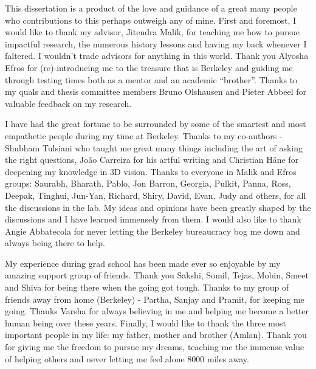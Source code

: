 This dissertation is a product of the love and guidance of a great many people who contributions to this perhaps outweigh any of mine. First and foremost, I would like to thank my advisor, Jitendra Malik, for teaching me how to pursue impactful research, the numerous history lessons and having my back whenever I faltered. I wouldn't trade advisors for anything in this world. Thank you Alyosha Efros for (re)-introducing me to the treasure that is Berkeley and guiding me through testing times both as a mentor and an academic ``brother''. Thanks to my quals and thesis committee members Bruno Olshausen and Pieter Abbeel for valuable feedback on my research.

I have had the great fortune to be surrounded by some of the smartest and most empathetic people during my time at Berkeley. Thanks to my co-authors - Shubham Tulsiani who taught me great many things including the art of asking the right questions, Jo\~ao Carreira for his artful writing and Christian H\"ane for deepening my knowledge in 3D vision. Thanks to everyone in Malik and Efros groups: Saurabh, Bharath, Pablo, Jon Barron, Georgia, Pulkit, Panna, Ross, Deepak, Tinghui, Jun-Yan, Richard, Shiry, David, Evan, Judy and others, for all the discussions in the lab. My ideas and opinions have been greatly shaped by the discussions and I have learned immensely from them. I would also like to thank Angie Abbatecola for never letting the Berkeley bureaucracy bog me down and always being there to help.

My experience during grad school has been made ever so enjoyable by my amazing support group of friends. Thank you Sakshi, Somil, Tejas, Mobin, Smeet and Shiva for being there when the going got tough. Thanks to my group of friends away from home (Berkeley) - Partha, Sanjay and Pramit, for keeping me going. Thanks Varsha for always believing in me and helping me become a better human being over these years. Finally, I would like to thank the three most important people in my life: my father, mother and brother (Amlan). Thank you for giving me the freedom to pursue my dreams, teaching me the immense value of helping others and never letting me feel alone 8000 miles away.